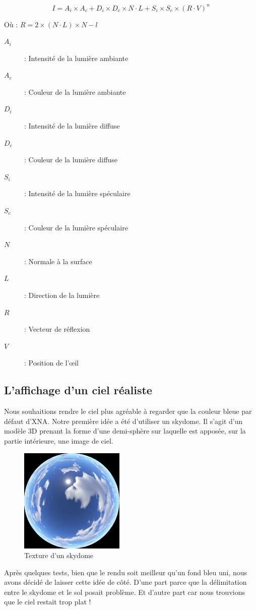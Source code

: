 \documentclass[11pt]{report}
\begin{document}
\[ I=A_{i}\times A_{c}+D_{i}\times D_{c}\times N\cdot L + S_{i}\times S_{c} \times \left(R\cdot V\right)^{n} \]

Où : \( R=2\times \left(N\cdot L\right)\times N-l \)

\begin{description}
\item[\(A_{i}\)] : Intensité de la lumière ambiante
\item[\(A_{c}\)] : Couleur de la lumière ambiante
\item[\(D_{i}\)] : Intensité de la lumière diffuse
\item[\(D_{c}\)] : Couleur de la lumière diffuse
\item[\(S_{i}\)] : Intensité de la lumière spéculaire
\item[\(S_{c}\)] : Couleur de la lumière spéculaire
\item[\(N\)] : Normale à la surface
\item[\(L\)] : Direction de la lumière
\item[\(R\)] : Vecteur de réflexion
\item[\(V\)] : Position de l'œil
\end{description}

\subsection{L'affichage d'un ciel réaliste}

Nous souhaitions rendre le ciel plus agréable à regarder que la couleur bleue par défaut d'XNA. Notre première idée a été d’utiliser un skydome. Il s’agit d’un modèle 3D prenant la forme d’une demi-sphère sur laquelle est apposée, sur la partie intérieure, une image de ciel.

\begin{figure}[htbp]
\centering
\includegraphics[width=5cm]{skydome_texture.png}
\caption{Texture d'un skydome}
\end{figure}

Après quelques tests, bien que le rendu soit meilleur qu’un fond bleu uni, nous avons décidé de laisser cette idée de côté. D’une part parce que la délimitation entre le skydome et le sol posait problème. Et d’autre part car nous trouvions que le ciel restait trop plat !
\end{document}
